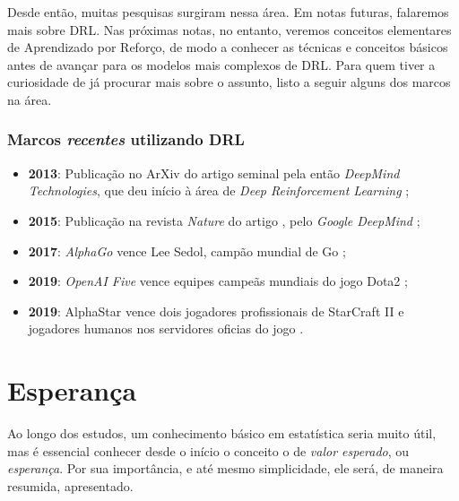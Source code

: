 \documentclass{article}
\begin{document}
            Desde então, muitas pesquisas surgiram nessa área. Em notas futuras, falaremos mais sobre DRL. Nas próximas notas, no entanto, veremos conceitos elementares de Aprendizado por Reforço, de modo a conhecer as técnicas e conceitos básicos antes de avançar para os modelos mais complexos de DRL. Para quem tiver a curiosidade de já procurar mais sobre o assunto, listo a seguir alguns dos marcos na área.
            
            \subsubsection{Marcos \emph{recentes} utilizando DRL}
            
                \begin{itemize}
                
                    \item \textbf{2013}: Publicação no ArXiv do artigo seminal \emph{} pela então \emph{DeepMind Technologies}, que deu início à área de \emph{Deep Reinforcement Learning} \cite{Mnih2013};
                    
                    \item \textbf{2015}: Publicação na revista \emph{Nature} do artigo \emph{}, pelo \emph{Google DeepMind} \cite{Mnih2015};
                    
                    \item \textbf{2017}: \emph{AlphaGo} vence Lee Sedol, campão mundial de Go \cite{Silver2016,AlphaGo2017};
                    
                    \item \textbf{2019}: \emph{OpenAI Five} vence equipes campeãs mundiais do jogo Dota2 \cite{Openai2019};
                    
                    \item \textbf{2019}: AlphaStar vence dois jogadores profissionais de StarCraft II e jogadores humanos nos servidores oficias do jogo \cite{Vinyals2019}.
                    
                \end{itemize}

    \section{Esperança}
            
        Ao longo dos estudos, um conhecimento básico em estatística seria muito útil, mas é essencial conhecer desde o início o conceito o de \emph{valor esperado}, ou \emph{esperança}. Por sua importância, e até mesmo simplicidade, ele será, de maneira resumida, apresentado.
        
\end{document}
